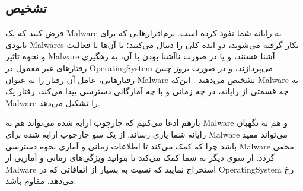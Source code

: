 \subsection{تشخیص }
فرض کنید که یک
\gls{Malware}
به رایانه شما نفوذ کرده است. نرم‌افزارهایی که برای نابودی
\glspl{Malware}
بکار گرفته می‌شوند، دو ایده کلی را دنبال می‌کنند؛ یا آن‌ها با فعالیت و نحوه تاثیر 
\gls{Malware}
آشنا هستند، و یا در صورت ناآشنا بودن با آن، به رهگیری رفتارهای غیر معمول در  \gls{OperatingSystem} می‌پردازند، و در صورت بروز چنین رفتارهایی، عامل آن رفتار را به عنوان 
\gls{Malware}
تشخیص می‌دهند
\cite{salem2008survey}.
این‌که
\gls{Malware}
به چه قسمتی از رایانه، در چه زمانی و با چه آمارگانی دسترسی پیدا می‌کند، رفتار یک
\gls{Malware}
را تشکیل می‌دهد.

بازهم ادعا می‌کنیم که چارچوب ارایه شده می‌تواند هم به 
\gls{Malware}
و هم به نگهبان رایانه شما یاری رساند. از یک سو چارچوب ارایه شده برای 
\gls{Malware}
می‌تواند مفید باشد چرا که کمک می‌کند تا اطلاعات زمانی و آماری نحوه دسترسی 
\gls{Malware}
مخفی گردد. از سوی دیگر به شما کمک می‌کند تا بتوانید ویژگی‌های زمانی و آماریی از
\gls{Malware}
استخراج نمایید که نسبت به بسیار از اتفاقاتی که در
\gls{OperatingSystem}
رخ می‌دهد، مقاوم باشد. 

